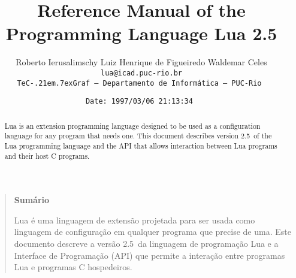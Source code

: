 

\newcommand{\rw}[1]{{\bf #1}}
\newcommand{\see}[1]{(see Section~\ref{#1})}
\newcommand{\nil}{{\bf nil}}
\newcommand{\Line}{\rule{\linewidth}{.5mm}}
\def\tecgraf{{\sf TeC\kern-.21em\lower.7ex\hbox{Graf}}}

\newcommand{\Index}[1]{#1\index{#1}}
\newcommand{\IndexVerb}[1]{{\tt #1}\index{#1}}
\newcommand{\Def}[1]{{\em #1}\index{#1}}
\newcommand{\Deffunc}[1]{\index{#1}}

\newcommand{\ff}{$\bullet$\ }

\newcommand{\Version}{2.5}

\makeindex



\title{Reference Manual of the Programming Language Lua \Version}

\author{%
Roberto Ierusalimschy\quad
Luiz Henrique de Figueiredo\quad
Waldemar Celes
\vspace{1.0ex}\\
\smallskip
\small\tt lua@icad.puc-rio.br
\vspace{2.0ex}\\
\tecgraf\ --- Departamento de Inform\'atica --- PUC-Rio
}

\date{\small \verb$Date: 1997/03/06 21:13:34 $}

\maketitle

\thispagestyle{empty}
\pagestyle{empty}

\begin{abstract}
\noindent
Lua is an extension programming language designed to be used
as a configuration language for any program that needs one.
This document describes version \Version\ of the Lua programming language and
the API that allows interaction between Lua programs and their host C programs.
\end{abstract}

\vspace{4ex}
\begin{quotation}
\small
\begin{center}{\bf Sum\'ario}\end{center}
\vspace{1ex}
\noindent
Lua \'e uma linguagem de extens\~ao projetada para ser usada como
linguagem de configura\c{c}\~ao em qualquer programa que precise de
uma.
Este documento descreve a vers\~ao \Version\ da linguagem de
programa\c{c}\~ao Lua e a Interface de Programa\c{c}\~ao (API) que permite
a intera\c{c}\~ao entre programas Lua e programas C hospedeiros.
\end{quotation}


